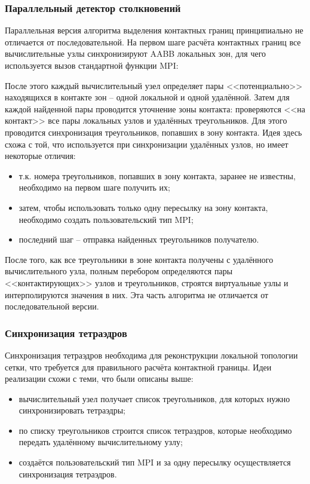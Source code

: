 \subsubsection{Параллельный детектор столкновений}
Параллельная версия алгоритма выделения контактных границ принципиально не отличается от последовательной. На первом шаге расчёта контактных границ все вычислительные узлы синхронизируют AABB локальных зон, для чего используется вызов стандартной функции MPI:

После этого каждый вычислительный узел определяет пары <<потенциально>> находящихся в контакте зон -- одной локальной и одной удалённой. Затем для каждой найденной пары проводится уточнение зоны контакта: проверяются <<на контакт>> все пары локальных узлов и удалённых треугольников. Для этого проводится синхронизация треугольников, попавших в зону контакта. Идея здесь схожа с той, что используется при синхронизации удалённых узлов, но имеет некоторые отличия:
\begin{itemize}
	\item т.к. номера треугольников, попавших в зону контакта, заранее не известны, необходимо на первом шаге получить их;
	\item затем, чтобы использовать только одну пересылку на зону контакта, необходимо создать пользовательский тип MPI;
	\item последний шаг -- отправка найденных треугольников получателю.
\end{itemize}
После того, как все треугольники в зоне контакта получены с удалённого вычислительного узла, полным перебором определяются пары <<контактирующих>> узлов и треугольников, строятся виртуальные узлы и интерполируются значения в них. Эта часть алгоритма не отличается от последовательной версии.
\subsubsection{Синхронизация тетраэдров}
Синхронизация тетраэдров необходима для реконструкции локальной топологии сетки, что требуется для правильного расчёта контактной границы. Идеи реализации схожи с теми, что были описаны выше:
\begin{itemize}
	\item вычислительный узел получает список треугольников, для которых нужно синхронизировать тетраэдры;
	\item по списку треугольников строится список тетраэдров, которые необходимо передать удалённому вычислительному узлу;
	\item создаётся пользовательский тип MPI и за одну пересылку осуществляется синхронизация тетраэдров.
\end{itemize}

